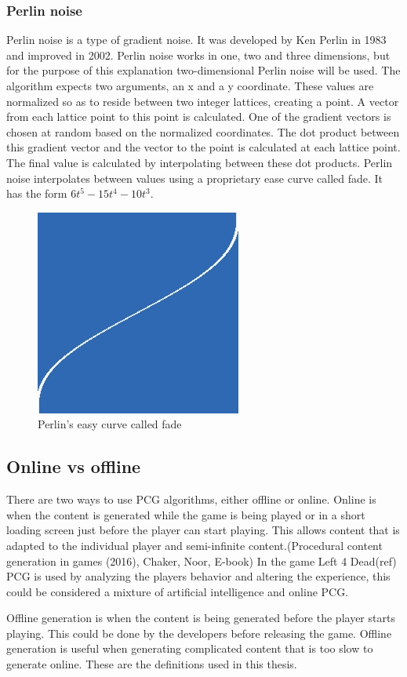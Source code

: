 		\subsubsection{Perlin noise}
		Perlin noise is a type of gradient noise. It was developed by Ken Perlin in 1983 and improved in 2002\cite{PerlinNoise}. Perlin noise works in one, two and three dimensions, but for the purpose of this explanation two-dimensional Perlin noise will be used. The algorithm expects two arguments, an x and a y coordinate. These values are normalized so as to reside between two integer lattices, creating a point. A vector from each lattice point to this point is calculated. One of the gradient vectors is chosen at random based on the normalized coordinates. The dot product between this gradient vector and the vector to the point is calculated at each lattice point. The final value is calculated by interpolating between these dot products. Perlin noise interpolates between values using a proprietary ease curve called fade. It has the form \begin{math}6t^5-15t^4-10t^3\end{math}.
		\begin{figure}
			\centering
			\includegraphics[width=0.5\linewidth]{"images/fade"}
			\caption{Perlin's easy curve called fade}
			\label{fig:fade}
		\end{figure}
	
	\subsection{Online vs offline}
	There are two ways to use PCG algorithms, either offline or online. Online is when the content is generated while the game is being played or in a short loading screen just before the player can start playing. This allows content that is adapted to the individual player and semi-infinite content.(Procedural content generation in games (2016), Chaker, Noor, E-book) In the game Left 4 Dead(ref) PCG is used by analyzing the players behavior and altering the experience, this could be considered a mixture of artificial intelligence and online PCG.
	\par Offline generation is when the content is being generated before the player starts playing. This could be done by the developers before releasing the game. Offline generation is useful when generating complicated content that is too slow to generate online.
	These are the definitions used in this thesis.
	
